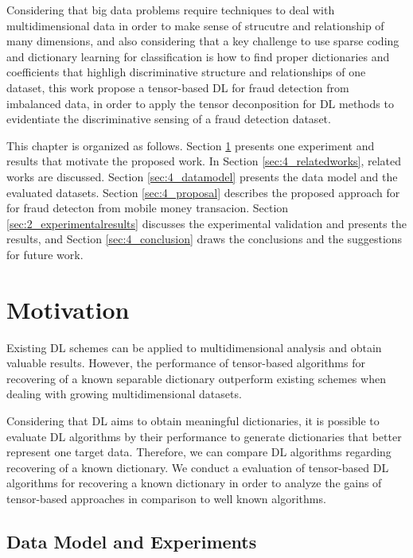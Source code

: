 Considering that big data problems require techniques to deal with multidimensional data in order to make sense of strucutre and relationship of many dimensions, and also considering that a key challenge to use sparse coding and dictionary learning for classification is how to find proper dictionaries and coefficients that highligh discriminative structure and relationships of one dataset, this work propose a tensor-based DL for fraud detection from imbalanced data, in order to apply the tensor deconposition for DL methods to evidentiate the discriminative sensing of a fraud detection dataset. 

This chapter is organized as follows. Section \ref{sec:4_motivation} presents one experiment and results that motivate the proposed work. In Section \ref{sec:4_relatedworks}, related works are discussed. Section \ref{sec:4_datamodel} presents the data model and the evaluated datasets. Section \ref{sec:4_proposal} describes the proposed approach for for fraud detecton from mobile money transacion. Section \ref{sec:2_experimentalresults} discusses the experimental validation and presents the results, and Section \ref{sec:4_conclusion} draws the conclusions and the suggestions for future work.


\section{Motivation}
\label{sec:4_motivation}

Existing DL schemes can be applied to multidimensional analysis and obtain valuable results. However, the performance of tensor-based algorithms for recovering of a known separable dictionary outperform existing schemes when dealing with growing multidimensional datasets.

Considering that DL aims to obtain meaningful dictionaries, it is possible to evaluate DL algorithms by their performance to generate dictionaries that better represent one target data. Therefore, we can compare DL algorithms regarding recovering of a known dictionary. We conduct a evaluation of tensor-based DL algorithms for recovering a known dictionary in order to analyze the gains of tensor-based approaches in comparison to well known algorithms.

\subsection{Data Model and Experiments}
\label{sec:4_motivation_datamodel}

